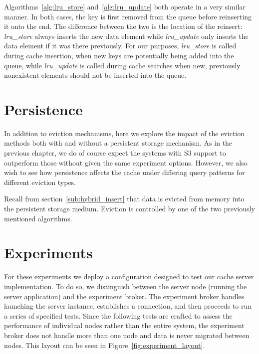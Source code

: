 Algorithms~\ref{alg:lru_store} and~\ref{alg:lru_update} both operate in a very
similar manner. In both cases, the key is first removed from the queue before
reinserting it onto the end. The difference between the two is the location of
the reinsert: \emph{lru\_store} always inserts the new data element while
\emph{lru\_update} only inserts the data element if it was there previously.
For our purposes, \emph{lru\_store} is called during cache insertion, when new
keys are potentially being added into the queue, while \emph{lru\_update} is
called during cache searches when new, previously nonexistent elements should
not be inserted into the queue.


\section{Persistence} %
\label{sec:persistence}
In addition to eviction mechanisms, here we explore the impact of the eviction
methods both with and without a persistent storage mechanism. As in the
previous chapter, we do of course expect the systems with S3 support to
outperform those without given the same experiment options. However, we also
wish to see how persistence affects the cache under differing query patterns
for different eviction types.

Recall from section~\ref{sub:hybrid_insert} that data is evicted from memory
into the persistent storage medium. Eviction is controlled by one of the two
previously mentioned algorithms.


\section{Experiments} %
\label{sec:experiments_eviction}
For these experiments we deploy a configuration designed to test our cache
server implementation. To do so, we distinguish between the server node
(running the server application) and the experiment broker. The experiment
broker handles launching the server instance, establishes a connection, and
then proceeds to run a series of specified tests. Since the following tests are
crafted to assess the performance of individual nodes rather than the entire
system, the experiment broker does not handle more than one node and data is
never migrated between nodes. This layout can be seen in
Figure~\ref{fig:experiment_layout}.

